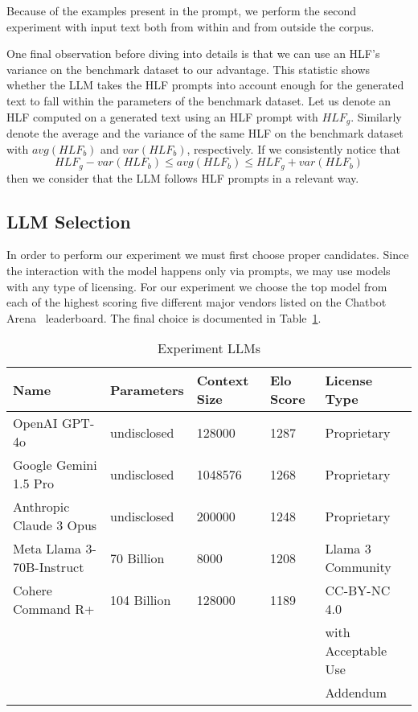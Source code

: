 \documentclass[runningheads,a4paper,11pt]{article}
\begin{document}
Because of the examples present in the prompt, we perform the second experiment
with input text both from within and from outside the corpus.

One final observation before diving into details is that we can use an HLF's
variance on the benchmark dataset to our advantage.
This statistic shows whether the LLM takes the HLF prompts into account enough
for the generated text to fall within the parameters of the benchmark dataset.
Let us denote an HLF computed on a generated text using an HLF prompt with
$HLF_g$.
Similarly denote the average and the variance of the same HLF on the benchmark
dataset with $avg(HLF_b)$ and $var(HLF_b)$, respectively.
If we consistently notice that
\[HLF_g - var(HLF_b) \leq avg(HLF_b) \leq HLF_g + var(HLF_b)\]
then we consider that the LLM follows HLF prompts in a relevant way.

\subsection{LLM Selection}\label{llm-selection}

In order to perform our experiment we must first choose proper candidates.
Since the interaction with the model happens only via prompts, we may use models
with any type of licensing.
For our experiment we choose the top model from each of the highest scoring five
different major vendors listed on the Chatbot Arena~\cite{chiang2024chatbot}
leaderboard.
The final choice is documented in Table~\ref{table-llm}.

\begin{table}[ht]
    \setlength\tabcolsep{6pt}
    \centering
    \begin{tabular}{@{}lllll@{}}\toprule
        Name                      & Parameters  & Context Size & Elo Score & License Type        \\ \toprule
        OpenAI GPT-4o             & undisclosed & 128000       & 1287      & Proprietary         \\
        Google Gemini 1.5 Pro     & undisclosed & 1048576      & 1268      & Proprietary         \\
        Anthropic Claude 3 Opus   & undisclosed & 200000       & 1248      & Proprietary         \\
        Meta Llama 3-70B-Instruct & 70 Billion  & 8000         & 1208      & Llama 3 Community   \\
        Cohere Command R+         & 104 Billion & 128000       & 1189      & CC-BY-NC 4.0        \\
                                  &             &              &           & with Acceptable Use \\
                                  &             &              &           & Addendum            \\ \bottomrule
    \end{tabular}
    \caption{Experiment LLMs}\label{table-llm}
\end{table}
\end{document}
